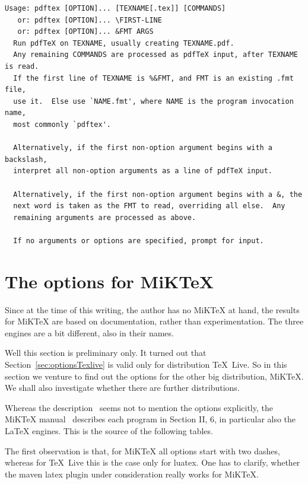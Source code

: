 \documentclass[a4paper]{article}%
\newcommand{\texlive}{\TeX~Live}
\newcommand{\miktex}{MiKTeX}
\begin{document}
\begin{verbatim}
Usage: pdftex [OPTION]... [TEXNAME[.tex]] [COMMANDS]
   or: pdftex [OPTION]... \FIRST-LINE
   or: pdftex [OPTION]... &FMT ARGS
  Run pdfTeX on TEXNAME, usually creating TEXNAME.pdf.
  Any remaining COMMANDS are processed as pdfTeX input, after TEXNAME is read.
  If the first line of TEXNAME is %&FMT, and FMT is an existing .fmt file,
  use it.  Else use `NAME.fmt', where NAME is the program invocation name,
  most commonly `pdftex'.

  Alternatively, if the first non-option argument begins with a backslash,
  interpret all non-option arguments as a line of pdfTeX input.

  Alternatively, if the first non-option argument begins with a &, the
  next word is taken as the FMT to read, overriding all else.  Any
  remaining arguments are processed as above.

  If no arguments or options are specified, prompt for input.
\end{verbatim}





\section{The options for \miktex}\label{sec:optionsMiktex}

Since at the time of this writing, the author has no \miktex{} at hand, 
the results for \miktex{} are based on documentation, rather than experimentation. 
The three engines are a bit different, also in their names. 


Well this section is preliminary only. 
It turned out that Section~\ref{sec:optionsTexlive} is valid only for distribution \texlive. 
So in this section we venture to find out the options for the other big distribution, 
\miktex. 
We shall also investigate whether there are further distributions. 

Whereas the description~\cite{Texlive} seems not to mention the options explicitly, 
the \miktex{} manual~\cite{MiKTeX} describes each program in Section II, 6, 
in particular also the \LaTeX{} engines. 
This is the source of the following tables. 


The first observation is that, for \miktex{} all options start with two dashes, 
whereas for \texlive{} this is the case only for luatex. 
One has to clarify, 
whether the maven latex plugin under consideration really works for \miktex. 
\end{document}
